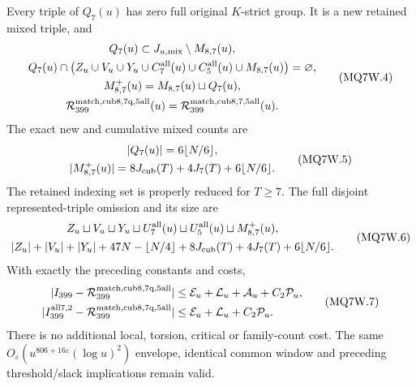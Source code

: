 \begin{theorem}
\label{AC-G212-window}
Every triple of $Q_7(u)$ has zero full original $K$-strict group.
It is a new retained mixed triple, and
\[
 \begin{gathered}
 Q_7(u)\subset J_{u,\rm mix}\setminus M_{8,7}(u),\\
 Q_7(u)\cap\bigl(Z_u\cup V_u\cup Y_u\cup C_7^{\rm all}(u)
                    \cup C_5^{\rm all}(u)\cup M_{8,7}(u)\bigr)
                                               =\varnothing,\\
 M_{8,7}^{+}(u)=M_{8,7}(u)\sqcup Q_7(u),\\
 \mathcal R_{399}^{\rm match,cub8,7q,5all}(u)
                   =\mathcal R_{399}^{\rm match,cub8,7,5all}(u).
 \end{gathered}\tag{MQ7W.4}
\]
The exact new and cumulative mixed counts are
\[
 \begin{gathered}
 |Q_7(u)|=6\lfloor N/6\rfloor,\\
 |M_{8,7}^{+}(u)|=8J_{\rm cub}(T)+4J_7(T)+6\lfloor N/6\rfloor.
 \end{gathered}\tag{MQ7W.5}
\]
The retained indexing set is properly reduced for $T\geq7$.
The full disjoint represented-triple omission and its size are
\[
 \begin{gathered}
 Z_u\sqcup V_u\sqcup Y_u\sqcup U_7^{\rm all}(u)
              \sqcup U_5^{\rm all}(u)\sqcup M_{8,7}^{+}(u),\\
 |Z_u|+|V_u|+|Y_u|+47N-\lfloor N/4\rfloor
          +8J_{\rm cub}(T)+4J_7(T)+6\lfloor N/6\rfloor.
 \end{gathered}\tag{MQ7W.6}
\]
With exactly the preceding constants and costs,
\[
 \begin{aligned}
 |I_{399}-\mathcal R_{399}^{\rm match,cub8,7q,5all}|&\leq
        \mathcal E_u+\mathcal L_u+\mathcal A_u+C_2\mathcal P_u,\\
 |I_{399}^{\rm all7,2}-\mathcal R_{399}^{\rm match,cub8,7q,5all}|&\leq
        \mathcal E_u+\mathcal L_u+C_2\mathcal P_u.
 \end{aligned}\tag{MQ7W.7}
\]
There is no additional local, torsion, critical or family-count cost.
The same $O_\varepsilon(u^{806+16\varepsilon}(\log u)^2)$ envelope,
identical common window and preceding threshold/slack implications
remain valid.
\end{theorem}

